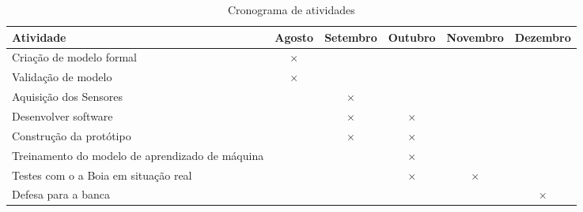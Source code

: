 \label{chapter:cronograma}

\begin{table}[htbp]
  \centering
  \caption{Cronograma de atividades}
  \label{tab:cronograma}
  \begin{tabularx}{\textwidth}{|X|c|c|c|c|c|}
    \hline
    \textbf{Atividade} & \textbf{Agosto} & \textbf{Setembro} & \textbf{Outubro} & \textbf{Novembro} & \textbf{Dezembro} \\
    \hline
    Criação de modelo formal & \(\times\) & & & & \\
    \hline
    Validação de modelo & \(\times\) &  &  & & \\
    \hline
    Aquisição dos Sensores & & \(\times\)  &  & & \\
    \hline
    Desenvolver software & & \(\times\)  & \(\times\) & & \\
    \hline
    Construção da protótipo &  & \(\times\) &  \(\times\) & & \\
   \hline
    Treinamento do modelo de aprendizado de máquina & & & \(\times\) & &  \\
    \hline
    Testes com o a Boia em situação real & & & \(\times\) & \(\times\) &  \\
    \hline
    Defesa para a banca & & & & & \(\times\)  \\
    \hline
  \end{tabularx}
\end{table}
